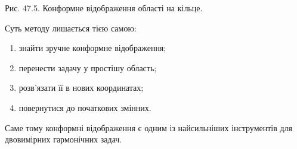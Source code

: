 \documentclass[
  ukrainian,
]{article}
\begin{document}
Рис. 47.5. Конформне відображення області на кільце.

Суть методу лишається тією самою:

\begin{enumerate}
\def\labelenumi{\arabic{enumi}.}
\item
  знайти зручне конформне відображення;
\item
  перенести задачу у простішу область;
\item
  розв'язати її в нових координатах;
\item
  повернутися до початкових змінних.
\end{enumerate}

Саме тому конформні відображення є одним із найсильніших інструментів
для двовимірних гармонічних задач.
\end{document}

